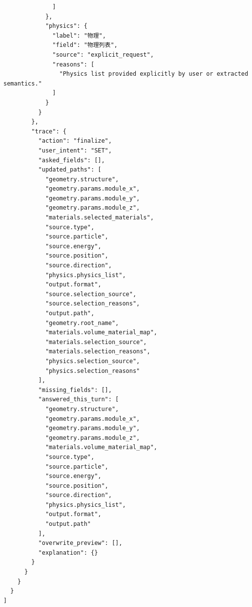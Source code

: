 \documentclass[11pt]{article}
\begin{document}
\begin{lstlisting}
              ]
            },
            "physics": {
              "label": "物理",
              "field": "物理列表",
              "source": "explicit_request",
              "reasons": [
                "Physics list provided explicitly by user or extracted semantics."
              ]
            }
          }
        },
        "trace": {
          "action": "finalize",
          "user_intent": "SET",
          "asked_fields": [],
          "updated_paths": [
            "geometry.structure",
            "geometry.params.module_x",
            "geometry.params.module_y",
            "geometry.params.module_z",
            "materials.selected_materials",
            "source.type",
            "source.particle",
            "source.energy",
            "source.position",
            "source.direction",
            "physics.physics_list",
            "output.format",
            "source.selection_source",
            "source.selection_reasons",
            "output.path",
            "geometry.root_name",
            "materials.volume_material_map",
            "materials.selection_source",
            "materials.selection_reasons",
            "physics.selection_source",
            "physics.selection_reasons"
          ],
          "missing_fields": [],
          "answered_this_turn": [
            "geometry.structure",
            "geometry.params.module_x",
            "geometry.params.module_y",
            "geometry.params.module_z",
            "materials.volume_material_map",
            "source.type",
            "source.particle",
            "source.energy",
            "source.position",
            "source.direction",
            "physics.physics_list",
            "output.format",
            "output.path"
          ],
          "overwrite_preview": [],
          "explanation": {}
        }
      }
    }
  }
]
\end{lstlisting}
\end{document}

